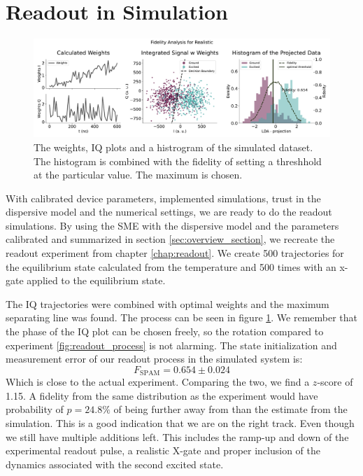 \section{Readout in Simulation}\label{sec:readout_in_simulation}
\begin{figure}[t]
    \centering
    \includegraphics[]{Simulations/budgets/figures/realistic_sme.pdf}
    \caption{The weights, IQ plots and a histrogram of the simulated dataset. The histogram is combined with the fidelity of setting a threshhold at the particular value. The maximum is chosen.}
    \label{fig:simulation_readout}
\end{figure}
With calibrated device parameters, implemented simulations, trust in the dispersive model and the numerical settings, we are ready to do the readout simulations. By using the SME with the dispersive model and the parameters calibrated and summarized in section \ref{sec:overview_section}, we recreate the readout experiment from chapter \ref{chap:readout}. We create 500 trajectories for the equilibrium state calculated from the temperature and 500 times with an x-gate applied to the equilibrium state.

The IQ trajectories were combined with optimal weights and the maximum separating line was found. The process can be seen in figure \ref{fig:simulation_readout}. We remember that the phase of the IQ plot can be chosen freely, so the rotation compared to experiment  \ref{fig:readout_process} is not alarming. The state initialization and measurement error of our readout process in the simulated system is:
\begin{equation}
    F_{\text{SPAM}} = 0.654 \pm 0.024
\end{equation}
Which is close to the actual experiment. Comparing the two, we find a $z$-score of 1.15. A fidelity from the same distribution as the experiment would have probability of  $p = 24.8 \%$ of being further away from than the estimate from the simulation. This is a good indication that we are on the right track. Even though we still have multiple additions left. This includes the ramp-up and down of the experimental readout pulse, a realistic X-gate and proper inclusion of the dynamics associated with the second excited state. 



